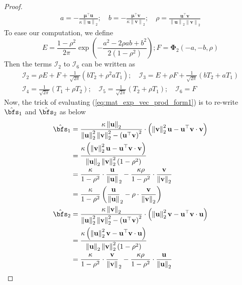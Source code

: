 \documentclass[10pt]{article} %
\theoremstyle{definition}
\theoremstyle{plain}
\newcommand{\paren}[1]{\left(#1\right)}
\newcommand{\norm}[1]{\left\|#1\right\|}
\def\bfu{{\mathbf{u}}}\def\bfv{{\mathbf{v}}}\def\bfw{{\mathbf{w}}}\def\bfx{{\mathbf{x}}}
\begin{document}
\begin{proof}
\begin{gather*}
        a = -\frac{\bm{\mu}^\top\bfu}{\kappa\norm{\bfu}_2};\quad b = -\frac{\bm{\mu}^\top\bfv}{\kappa\norm{\bfv}_2};\quad \rho = \frac{\bfu^\top\bfv}{\norm{\bfu}_2\norm{\bfv}_2}
    \end{gather*}
    To ease our computation, we define 
    \[
        E = \frac{1-\rho^2}{2\pi}\exp\paren{-\frac{a^2 - 2\rho ab + b^2}{2\paren{1-\rho^2}}}; F = \bm{\Phi}_2\paren{-a,-b,\rho}
    \]
    Then the terms $\mathcal{I}_2$ to $\mathcal{I}_6$ can be written as
    \begin{equation}
        \label{eq:I_terms_simp}
        \begin{gathered}
            \mathcal{I}_2 = \rho E + F + \frac{1}{\sqrt{2\pi}}\paren{ b T_2 + \rho^2a T_1};\quad \mathcal{I}_3 = E + \rho F + \frac{1}{\sqrt{2\pi}}\paren{ b T_2 + a T_1}\\
            \mathcal{I}_4 =\frac{1}{\sqrt{2\pi}}\paren{T_1 + \rho T_2};\quad \mathcal{I}_5 = \frac{1}{\sqrt{2\pi}}\paren{T_2 + \rho T_1};\quad\mathcal{I}_6 = F
            \end{gathered}
    \end{equation}
    Now, the trick of evaluating (\ref{eq:mat_exp_vec_prod_form1}) is to re-write $\hat{\bfs}_1$ and $\hat{\bfs}_2$ as below
    \begin{equation}
        \label{eq:s1_s2_simp}
        \begin{aligned}
            \hat{\bfs}_1 & = \frac{\kappa\norm{\bfu}_2}{ \norm{\bfu}_2^2\norm{\bfv}_2^2 - \paren{\bfu^\top\bfv}^2}\cdot\paren{\norm{\bfv}_2^2\bfu - \bfu^\top\bfv\cdot\bfv}\\
            & = \frac{\kappa\paren{\norm{\bfv}_2^2\bfu - \bfu^\top\bfv\cdot\bfv}}{\norm{\bfu}_2\norm{\bfv}_2^2\paren{1 - \rho^2}}\\
            & = \frac{\kappa}{1-\rho^2}\cdot\frac{\bfu}{\norm{\bfu}}_2 - \frac{\kappa\rho}{1 - \rho^2}\cdot\frac{\bfv}{\norm{\bfv}_2}\\
            & = \frac{\kappa}{1-\rho^2}\paren{\frac{\bfu}{\norm{\bfu}}_2 - \rho\cdot \frac{\bfv}{\norm{\bfv}_2}}\\
            \hat{\bfs}_2 & = \frac{\kappa\norm{\bfv}_2}{ \norm{\bfu}_2^2\norm{\bfv}_2^2 - \paren{\bfu^\top\bfv}^2}\cdot\paren{\norm{\bfu}_2^2\bfv - \bfu^\top\bfv\cdot\bfu}\\
            & = \frac{\kappa\paren{\norm{\bfu}_2^2\bfv - \bfu^\top\bfv\cdot\bfu}}{\norm{\bfu}_2\norm{\bfv}_2^2\paren{1 - \rho^2}}\\
            & = \frac{\kappa}{1-\rho^2}\cdot\frac{\bfv}{\norm{\bfv}}_2 - \frac{\kappa\rho}{1 - \rho^2}\cdot\frac{\bfu}{\norm{\bfu}_2}\\

\end{aligned}
\end{equation}
\end{proof}
\end{document}
